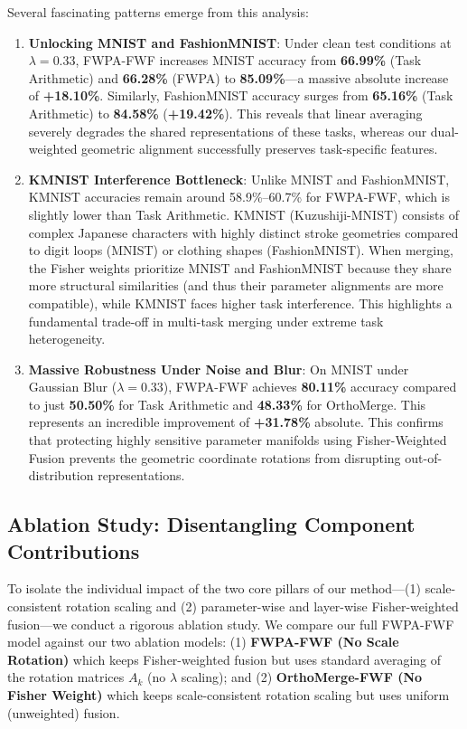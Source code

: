 \documentclass{article}
\theoremstyle{plain}
\theoremstyle{definition}
\theoremstyle{remark}
\begin{document}
Several fascinating patterns emerge from this analysis:
\begin{enumerate}
    \item \textbf{Unlocking MNIST and FashionMNIST}: Under clean test conditions at $\lambda=0.33$, FWPA-FWF increases MNIST accuracy from \textbf{66.99\%} (Task Arithmetic) and \textbf{66.28\%} (FWPA) to \textbf{85.09\%}—a massive absolute increase of \textbf{+18.10\%}. Similarly, FashionMNIST accuracy surges from \textbf{65.16\%} (Task Arithmetic) to \textbf{84.58\%} (\textbf{+19.42\%}). This reveals that linear averaging severely degrades the shared representations of these tasks, whereas our dual-weighted geometric alignment successfully preserves task-specific features.
    \item \textbf{KMNIST Interference Bottleneck}: Unlike MNIST and FashionMNIST, KMNIST accuracies remain around 58.9\%--60.7\% for FWPA-FWF, which is slightly lower than Task Arithmetic. KMNIST (Kuzushiji-MNIST) consists of complex Japanese characters with highly distinct stroke geometries compared to digit loops (MNIST) or clothing shapes (FashionMNIST). When merging, the Fisher weights prioritize MNIST and FashionMNIST because they share more structural similarities (and thus their parameter alignments are more compatible), while KMNIST faces higher task interference. This highlights a fundamental trade-off in multi-task merging under extreme task heterogeneity.
    \item \textbf{Massive Robustness Under Noise and Blur}: On MNIST under Gaussian Blur ($\lambda=0.33$), FWPA-FWF achieves \textbf{80.11\%} accuracy compared to just \textbf{50.50\%} for Task Arithmetic and \textbf{48.33\%} for OrthoMerge. This represents an incredible improvement of \textbf{+31.78\%} absolute. This confirms that protecting highly sensitive parameter manifolds using Fisher-Weighted Fusion prevents the geometric coordinate rotations from disrupting out-of-distribution representations.
\end{enumerate}

\subsection{Ablation Study: Disentangling Component Contributions}
To isolate the individual impact of the two core pillars of our method---(1) scale-consistent rotation scaling and (2) parameter-wise and layer-wise Fisher-weighted fusion---we conduct a rigorous ablation study. We compare our full FWPA-FWF model against our two ablation models: (1) \textbf{FWPA-FWF (No Scale Rotation)} which keeps Fisher-weighted fusion but uses standard averaging of the rotation matrices $A_k$ (no $\lambda$ scaling); and (2) \textbf{OrthoMerge-FWF (No Fisher Weight)} which keeps scale-consistent rotation scaling but uses uniform (unweighted) fusion.
\end{document}
